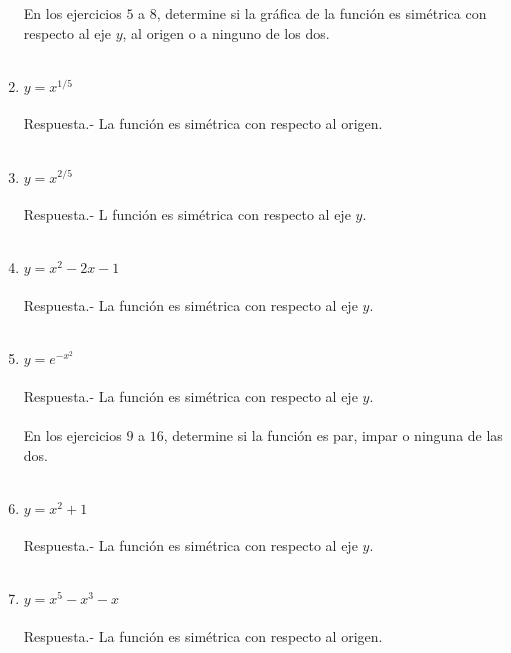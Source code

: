 \begin{enumerate}
En los ejercicios $5$ a $8$, determine si la gráfica de la función es simétrica con respecto al eje $y$, al origen o a ninguno de los dos.\\\\

\item $y=x^{1/5}$\\\\
    Respuesta.-\; La función es simétrica con respecto al origen.\\\\

\item $y=x^{2/5}$\\\\
    Respuesta.-\; L función es simétrica con respecto al eje $y$.\\\\

\item $y=x^2-2x-1$\\\\
    Respuesta.-\; La función es simétrica con respecto al eje $y$.\\\\

\item $y=e^{-x^2}$\\\\
    Respuesta.-\; La función es simétrica con respecto al eje $y$.\\\\

En los ejercicios $9$ a $16$, determine si la función es par, impar o ninguna de las dos.\\\\

\item $y=x^2 + 1$\\\\
    Respuesta.-\; La función es simétrica con respecto al eje $y$.\\\\

\item $y=x^5 - x^3 - x$\\\\
    Respuesta.-\; La función es simétrica con respecto al origen.\\\\


\end{enumerate}

